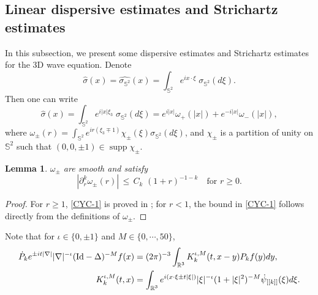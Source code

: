 \documentclass[11pt,twoside]{article}
\def\R{\mathop{\mathbb R\kern 0pt}\nolimits}
\newcommand{\pk}{\dot{P}_k}
\newcommand{\Id}{\mathrm{Id}}
\DeclareMathOperator{\supp}{supp}
\newcommand{\Sph}{\mathbb{S}^2}
\theoremstyle{plain}
\newtheorem{lemma}[theorem]{Lemma}
\theoremstyle{definition}
\numberwithin{equation}{section}
\begin{document}
	\subsection{Linear dispersive estimates and Strichartz estimates}\label{sec:Linear dispersive estimate and Strichartz estimate}

	In this subsection, we present some dispersive estimates and Strichartz estimates for the 3D wave equation. Denote
	\begin{equation}
		\hat{\sigma}(x) = \widehat{\sigma_{\mathbb{S}^2}}(x)=\int_{\mathbb{S}^2}e^{i x\cdot\xi}\;\sigma_{\mathbb{S}^2}\left(d\xi\right).
	\end{equation}
	Then one can write
	\begin{equation*}
	\hat{\sigma}(x)=\int_{\mathbb{S}^2}e^{i |x|\xi_3}\;\sigma_{\mathbb{S}^2}\left(d\xi\right)=e^{i|x|}\omega_{+}(|x|)+e^{-i|x|}\omega_{-}(|x|),
	\end{equation*}
	where $\omega_{\pm}(r)=\int_{\mathbb{S}^2}e^{i r(\xi_3\mp 1)}\chi_\pm(\xi)\sigma_{\mathbb{S}^2}\left(d\xi\right)$,
and $\chi_\pm$ is a partition of unity on $\Sph$ such that $(0,0,\pm1)\in\supp\chi_\pm$.
	\begin{lemma}\label{lem:unit sphere measure}
		$\omega_{\pm}$ are smooth and satisfy
		\begin{equation}\label{CYC-1}
			|\partial_{r}^{k}\omega_{\pm}(r)|\,\le\,{ C}_{k}\,\,(1+r)^{-1-k}\quad\text{for $r\ge 0$}.
		\end{equation}
	\end{lemma}
	\begin{proof}
		For $r\ge 1$, \eqref{CYC-1} is proved in \cite[Corollary 2.37]{Schlag}; for $r<1$, the bound
in \eqref{CYC-1} follows directly from the definitions of $\omega_{\pm}$.
	\end{proof}

	Note that for $\iota\in\{0,\pm1\}$ and $M\in \{0,\cdots,50\}$,
	\begin{equation}\label{def:KklM}
		\begin{split}
			\pk e^{\pm it|\nabla|}|\nabla|^{-\iota}(\Id-\Delta)^{-M}f(x)&=(2\pi)^{-3}\int_{\R^3}K_k^{\iota,M}(t,x-y)P_kf(y)dy,\\
			K_k^{\iota,M}(t,x)&=\int_{\R^3}e^{i(x\cdot\xi\pm t|\xi|)}|\xi|^{-\iota}(1+|\xi|^2)^{-M}\dot{\psi}_{[[k]]}(\xi)d\xi.\\
		\end{split}
	\end{equation}
\end{document}
